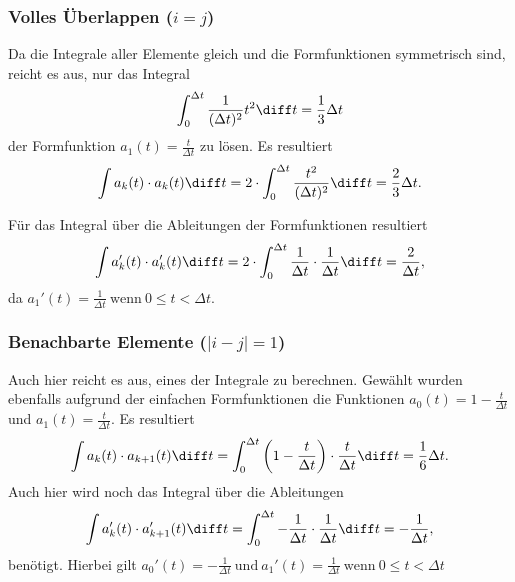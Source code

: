 \subsubsection{Volles Überlappen ($i = j$)}
Da die Integrale aller Elemente gleich und die Formfunktionen symmetrisch sind, reicht es aus, nur das Integral
\begin{equation}
    \int_{0}^{\Delta t} \frac{1}{(\Delta t)^2} t^2 \diff t = \frac{1}{3} \Delta t
\end{equation}
der Formfunktion $ a_1(t) = \frac{t}{\Delta t} $ zu lösen.
Es resultiert
\begin{equation}
    \int a_k(t) \cdot a_k(t) \diff t = 2 \cdot \int_{0}^{\Delta t} \frac{t^2}{(\Delta t)^2} \diff t = \frac{2}{3} \Delta t.
\end{equation}

Für das Integral über die Ableitungen der Formfunktionen resultiert
\begin{equation}
    \int a_k'(t) \cdot a_k'(t) \diff t = 2 \cdot \int_{0}^{\Delta t} \frac{1}{\Delta t} \cdot \frac{1}{\Delta t} \diff t = \frac{2}{\Delta t},
\end{equation}
da $a_1'(t)= \frac{1}{\Delta t} \ \text{wenn} \ 0 \leq t < \Delta t$.

\subsubsection{Benachbarte Elemente ($|i - j| = 1$)}
Auch hier reicht es aus, eines der Integrale zu berechnen. 
Gewählt wurden ebenfalls aufgrund der einfachen Formfunktionen die Funktionen $a_0(t) = 1 - \frac{t}{\Delta t}$ und $a_1(t) = \frac{t}{\Delta t}$.
Es resultiert
\begin{equation}
    \int a_k(t) \cdot a_{k+1}(t) \diff t = \int_{0}^{\Delta t} \left(1 - \frac{t}{\Delta t}\right) \cdot \frac{t}{\Delta t} \diff t = \frac{1}{6} \Delta t.
\end{equation}
Auch hier wird noch das Integral über die Ableitungen 
\begin{equation}
    \int a_k'(t) \cdot a_{k+1}'(t) \diff t = \int_{0}^{\Delta t} -\frac{1}{\Delta t} \cdot \frac{1}{\Delta t} \diff t = -\frac{1}{\Delta t},
\end{equation}
benötigt.
Hierbei gilt $a_0'(t)= -\frac{1}{\Delta t} \ \text{und} \ a_1'(t)= \frac{1}{\Delta t} \ \text{wenn} \ 0 \leq t < \Delta t$

